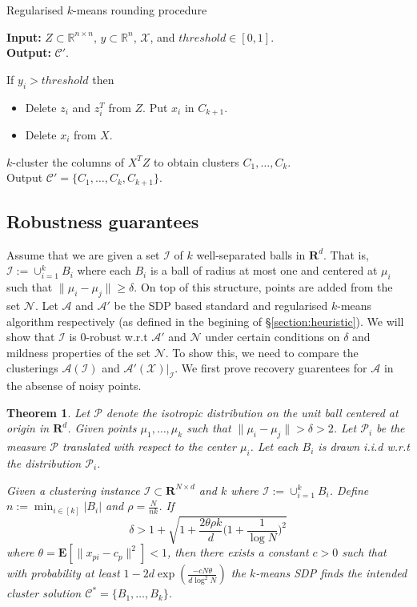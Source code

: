 \documentclass[12pt]{article}
\newcommand{\mc}{\mathcal}
\newcommand{\mb}{\mathbf}
\newtheorem{theorem}{Theorem}
\begin{document}
\begin{algorithm}[t]
\caption{Regularised $k$-means rounding procedure}
\label{alg:roundSDP}
	\textbf{Input: }{ $Z \subset \mathbb{R}^{n\times n}$, $y \subset \mathbb{R}^{n}$, $\mc{X}$, and $threshold \in [0,1]$.}\\
	\textbf{Output: }{$\mc C'$.}
	
	If $y_i > threshold$ then
	\begin{itemize}[nolistsep] 
		\item[] Delete $z_i$ and $z_i^T$ from $Z$. Put $x_i$ in $C_{k+1}$.
		\item[] Delete $x_i$ from $X$.
	\end{itemize}
	$k$-cluster the columns of $X^TZ$ to obtain clusters $C_1, \ldots, C_k$.\\
	Output $\mc C' = \{C_1, \ldots, C_k, C_{k+1}\}$.
\end{algorithm}

\subsection{Robustness guarantees}
\label{subsection:sdpRobust}

Assume that we are given a set $\mc I$ of $k$ well-separated balls in $\mb R^d$. That is, $\mc I := \cup_{i=1}^k B_i$ where each $B_i$ is a ball of radius at most one and centered at $\mu_i$ such that $\|\mu_i - \mu_j\| \ge \delta$. On top of this structure, points are added from the set $\mc N$. Let $\mc A$ and $\mc A'$ be the SDP based standard and regularised $k$-means algorithm respectively (as defined in the begining of \S \ref{section:heuristic}). We will show that $\mc I$ is $0$-robust w.r.t $\mc A'$ and $\mc N$ under certain conditions on $\delta$ and mildness properties of the set $\mc N$. To show this, we need to compare the clusterings $\mc A(\mc I)$ and $\mc A'(\mc X)|_{\mc I}$. We first prove recovery guarentees for $\mc A$ in the absense of noisy points.

\begin{theorem}
\label{thm:SDPGeneral}
Let $\mc P$ denote the isotropic distribution on the unit ball centered at origin in $\mb R^d$. Given points $\mu_1, \ldots, \mu_k$ such that $\|\mu_i - \mu_j\| > \delta  > 2$. Let $\mc P_i$ be the measure $\mc P$ translated with respect to the center $\mu_i$. Let each $B_i$ is drawn i.i.d w.r.t the distribution $\mc P_i$. 

Given a clustering instance $\mc I \subset \mb R^{N\times d}$ and $k$ where $\mc I := \cup_{i=1}^k B_i$. Define $ n := \min_{i\in[k]} |B_i|$ and $\rho = \frac{N}{nk}$. If
$$\delta > 1 + \sqrt{1+\frac{2\theta\rho k}{d}\Big(1+\frac{1}{\log N}\Big)^2}$$  
where $\theta = \mb E[\|x_{pi}-c_p\|^2] < 1$, then there exists a constant $c > 0$ such that with probability at least $1 - 2d\exp(\frac{-cN\theta}{d\log^2N})$ the $k$-means SDP finds the intended cluster solution  $\mc C^* = \{B_1, \ldots, B_k\}$.
\end{theorem}
\end{document}
